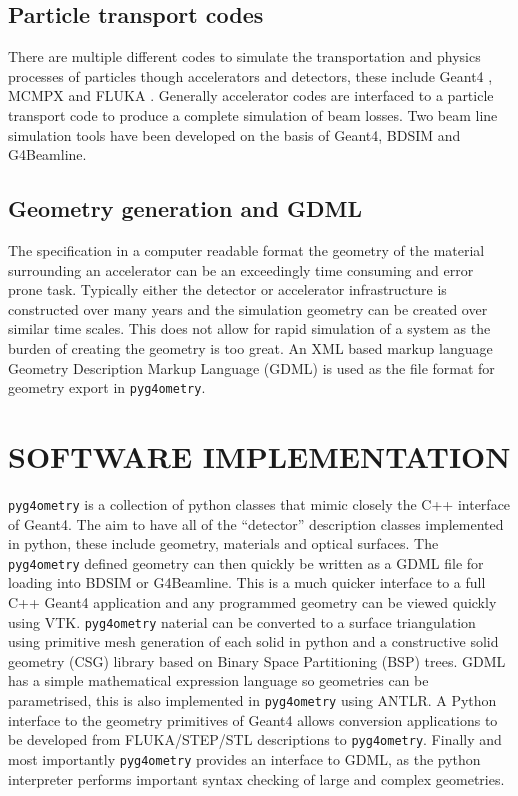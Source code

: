 \documentclass[a4paper,
               keeplastbox,   %
               ]{jacow}
\begin{document}
\subsection{Particle transport codes}
There are multiple different codes to simulate the transportation and physics processes of particles though accelerators and detectors, these include Geant4 \cite{geant4}, MCMPX and FLUKA \cite{fluka}. Generally accelerator codes are interfaced  to a particle transport code to produce a complete simulation of beam losses. Two beam line simulation tools have been developed on the basis of Geant4, BDSIM and G4Beamline.    

\subsection{Geometry generation and GDML}
The specification in a computer readable format the geometry of the material surrounding an accelerator can be an exceedingly time consuming and error prone task. Typically either the detector or accelerator infrastructure is constructed over many years and the simulation geometry can be created over similar time scales. This does not allow for rapid simulation of a system as the burden of creating the geometry is too great. An XML based markup language Geometry Description Markup Language (GDML) is used as the file format for geometry export in \verb|pyg4ometry|.

\section{SOFTWARE IMPLEMENTATION}
\verb|pyg4ometry| is a collection of python classes that mimic closely the C++ interface of Geant4. The aim to have all of the ``detector'' description classes implemented in python, these include geometry, materials and optical surfaces. The \verb|pyg4ometry| defined geometry can then quickly be written as a GDML file for loading into BDSIM or G4Beamline. This is a much quicker interface to a full C++ Geant4 application and any programmed geometry can be viewed quickly using VTK. \verb|pyg4ometry| naterial can be converted to a surface triangulation using primitive mesh generation of each solid in python and a constructive solid geometry (CSG) library based on Binary Space Partitioning (BSP) trees. GDML has a simple mathematical expression language so geometries can be parametrised, this is also implemented in \verb|pyg4ometry| using ANTLR. A Python interface to the geometry primitives of Geant4 allows conversion applications to be developed from FLUKA/STEP/STL descriptions to \verb|pyg4ometry|. Finally and most importantly \verb|pyg4ometry| provides an interface to GDML, as the python interpreter performs important syntax checking of large and complex geometries. 
\end{document}
